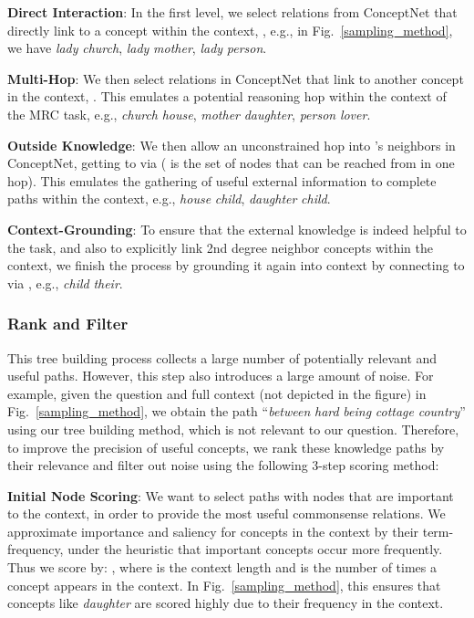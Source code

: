 \documentclass[11pt,a4paper]{article}
\def\figref#1{Fig.~\ref{#1}}
\begin{document}
\noindent\textbf{Direct Interaction}:
In the first level, we select relations  from ConceptNet that directly link  to a concept within the context, , e.g., in \figref{sampling_method}, we have {\it lady}  {\it church}, {\it lady}  {\it mother}, {\it lady}  {\it person}.

\noindent\textbf{Multi-Hop}:
We then select relations in ConceptNet  that link  to another concept in the context, . This emulates a potential reasoning hop within the context of the MRC task, e.g., {\it church}  {\it house}, {\it mother}   {\it daughter}, {\it person}   {\it lover}.
    
\noindent\textbf{Outside Knowledge}:
We then allow an unconstrained hop into 's neighbors in ConceptNet, getting to  via  ( is the set of nodes that can be reached from  in one hop). This emulates the gathering of useful external information to complete paths within the context, e.g., {\it house}  {\it child}, {\it daughter}  {\it child}.
    
\noindent\textbf{Context-Grounding}:
To ensure that the external knowledge is indeed helpful to the task, and also to explicitly link 2nd degree neighbor concepts within the context, we finish the process by grounding it again into context by connecting  to  via , e.g., {\it child}  {\it their}.

\subsubsection{Rank and Filter}
This tree building process collects a large number of potentially relevant and useful paths. However, this step also introduces a large amount of noise. For example, given the question and full context (not depicted in the figure) in \figref{sampling_method}, we obtain the path ``{\it between}   {\it hard}   {\it being}   {\it cottage}   {\it country}''  using our tree building method, which is not relevant to our question.
Therefore, to improve the precision of useful concepts, we rank these knowledge paths by their relevance and filter out noise using the following 3-step scoring method:


\noindent\textbf{Initial Node Scoring}:
We want to select paths with nodes that are important to the context, in order to provide the most useful commonsense relations.
We approximate importance and saliency for concepts in the context by their term-frequency, under the heuristic that important concepts occur more frequently. Thus we score  by:
,
where  is the context length and  is the number of times a concept appears in the context. In \figref{sampling_method}, this ensures that concepts like {\it daughter} are scored highly due to their frequency in the context.
\end{document}
